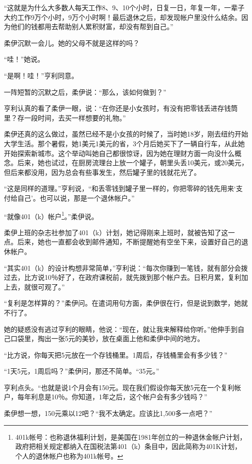 “这就是为什么大多数人每天工作8、9、10个小时，日复一日，年复一年，一辈子大约工作9万个小时，9万个小时啊！最后退休之后，却发现帐户里没什么结余。因为他们的钱都用去帮助别人累积财富，却没有帮到自己。”

柔伊沉默一会儿。她的父母不就是这样的吗？

“哇！”她说。

“是啊！哇！”亨利同意。

一阵短暂的沉默之后，柔伊说：“那么，该如何做到？”

亨利认真的看了柔伊一眼，说：“在你还是小女孩时，有没有把零钱丢进存钱筒里？存一段时间，去买一样想要的礼物。”

柔伊还真的这么做过，虽然已经不是小女孩的时候了，当时她18岁，刚去纽约开始大学生活。那个暑假，她1美元1美元的省，3个月后她买下了一辆自行车，从此她开始探索新城市。这个举动叫她自己都很惊讶，因为她在理财方面一向没什么概念。后来，她也试过，在厨房流理台上放一个罐子，朝里头丢10美元，或20美元，但后来都没用，因为总会有些事发生，然后罐子里的钱就花光了。

“这是同样的道理。”亨利说，“和丢零钱到罐子里一样的，你把零碎的钱先用来‘支付给自己’。也可以说，那是一个退休帐户。”

“就像401（k）帐户\footnote{401k帐号：也称退休福利计划，是美国在1981年创立的一种退休金帐户计划，政府把相关规定都纳入在国税法第401（k）条目中，因此简称为401K计划，个人的退休帐户也称为401k帐号。}。”柔伊说。

柔伊上班的杂志社参加了401（k）计划，她记得刚来上班时，就被告知了这一点。后来，她也一直都会收到邮件通知，不断提醒她有空坐下来，设置好自己的退休帐户。

“其实401（k）的设计构想非常简单，”亨利说：“每次你赚到一笔钱，就有部分会拨过去，比方说10％好了，在政府课税前，就先拨到那个帐户去。日积月累，复利加上去，就很可观了。”

“复利是怎样算的？”柔伊问。在遣词用句方面，柔伊很在行，但是说到数学，她就不行了。

她的疑惑没有逃过亨利的眼睛，他说：“现在，就让我来解释给你听。”他伸手到自己口袋里，掏出一张5元的美钞，放在桌面上他和柔伊中间的地方。

“比方说，你每天把5元放在一个存钱桶里。1周后，存钱桶里会有多少钱？”

“1天5元，1周后吗？”柔伊问，那还不简单。“35元。”

亨利点头。“也就是说1个月会有150元。现在我们假设你每天放5元在一个复利帐户，每年利息是10％。你知道，1年之后，这个帐户会有多少钱吗？”

柔伊想一想，150元乘以12吧？“我不太确定。应该比1,500多一点吧？”

